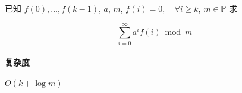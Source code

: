 已知 \(f(0),\dots,f(k-1)\), \(a\), \(m\), \(f(i)=0,\quad \forall i\geq k\), \(m\in\mathbb{P}\) 求

\[
    \sum_{i=0}^{\infty} a^i f(i)\bmod{m}
\]

\paragraph{复杂度}

\(O(k+\log m)\)